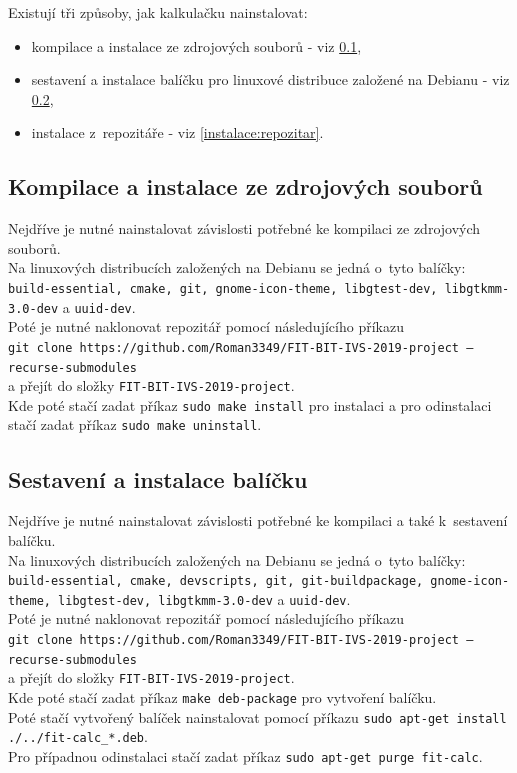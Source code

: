 \documentclass[11pt,a4paper,titlepage]{article}
\begin{document}
	Existují tři způsoby, jak kalkulačku nainstalovat:

	\begin{itemize}
		\item kompilace a instalace ze zdrojových souborů - viz \ref{instalace:manualni},
		\item sestavení a instalace balíčku pro linuxové distribuce založené na Debianu - viz \ref{instalace:balicek},
		\item instalace z~repozitáře - viz \ref{instalace:repozitar}.
	\end{itemize}

	\subsection{Kompilace a instalace ze zdrojových souborů}\label{instalace:manualni}

	Nejdříve je nutné nainstalovat závislosti potřebné ke kompilaci ze zdrojových souborů. \\
	Na linuxových distribucích založených na Debianu se jedná o~tyto balíčky: \texttt{build-essential, cmake, git, gnome-icon-theme, libgtest-dev, libgtkmm-3.0-dev} a \texttt{uuid-dev}. \\

	Poté je nutné naklonovat repozitář pomocí následujícího příkazu \\ \texttt{git clone https://github.com/Roman3349/FIT-BIT-IVS-2019-project --recurse-submodules} \\ a přejít do složky \texttt{FIT-BIT-IVS-2019-project}. \\
	Kde poté stačí zadat příkaz \texttt{sudo make install} pro instalaci a pro odinstalaci stačí zadat příkaz \texttt{sudo make uninstall}.

	\subsection{Sestavení a instalace balíčku}\label{instalace:balicek}

	Nejdříve je nutné nainstalovat závislosti potřebné ke kompilaci a také k~sestavení balíčku. \\
	Na linuxových distribucích založených na Debianu se jedná o~tyto balíčky: \texttt{build-essential, cmake, devscripts, git, git-buildpackage, gnome-icon-theme, libgtest-dev, libgtkmm-3.0-dev} a \texttt{uuid-dev}. \\

	Poté je nutné naklonovat repozitář pomocí následujícího příkazu \\ \texttt{git clone https://github.com/Roman3349/FIT-BIT-IVS-2019-project --recurse-submodules} \\ a přejít do složky \texttt{FIT-BIT-IVS-2019-project}. \\
	Kde poté stačí zadat příkaz \texttt{make deb-package} pro vytvoření balíčku. \\
	Poté stačí vytvořený balíček nainstalovat pomocí příkazu \texttt{sudo apt-get install ./../fit-calc\_*.deb}. \\
	Pro případnou odinstalaci stačí zadat příkaz \texttt{sudo apt-get purge fit-calc}.
\end{document}
